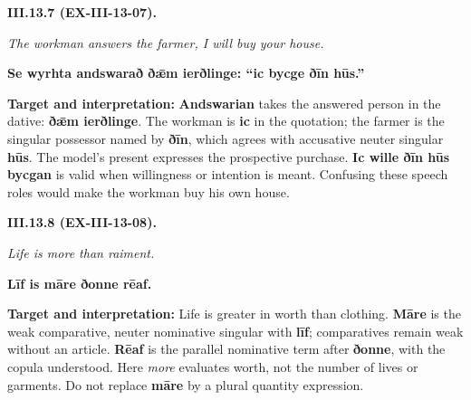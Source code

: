 \par\begin{minipage}{\linewidth}\raggedright
\textbf{III.13.7 (EX-III-13-07).}

\emph{The workman answers the farmer, I will buy your house.}

\textbf{Se wyrhta andswarað ðǣm ierðlinge: “ic bycge ðīn hūs.”}

\textbf{Target and interpretation:} \textbf{Andswarian} takes the answered person in the dative: \textbf{ðǣm ierðlinge}. The workman is \textbf{ic} in the quotation; the farmer is the singular possessor named by \textbf{ðīn}, which agrees with accusative neuter singular \textbf{hūs}. The model's present expresses the prospective purchase. \textbf{Ic wille ðīn hūs bycgan} is valid when willingness or intention is meant. Confusing these speech roles would make the workman buy his own house.

\end{minipage}\par\addvspace{4pt}

\par\begin{minipage}{\linewidth}\raggedright
\textbf{III.13.8 (EX-III-13-08).}

\emph{Life is more than raiment.}

\textbf{Līf is māre ðonne rēaf.}

\textbf{Target and interpretation:} Life is greater in worth than clothing. \textbf{Māre} is the weak comparative, neuter nominative singular with \textbf{līf}; comparatives remain weak without an article. \textbf{Rēaf} is the parallel nominative term after \textbf{ðonne}, with the copula understood. Here \emph{more} evaluates worth, not the number of lives or garments. Do not replace \textbf{māre} by a plural quantity expression.

\end{minipage}\par\addvspace{4pt}

